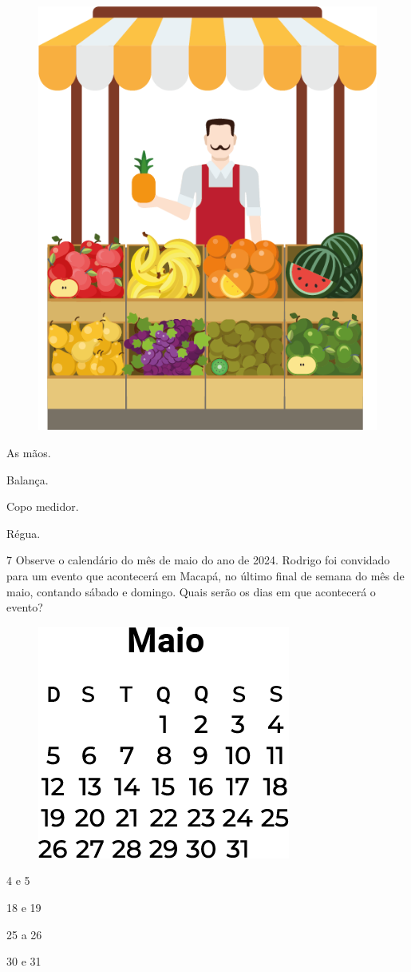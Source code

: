 \begin{figure}[htpb!]
\centering
\includegraphics[width=.3\textwidth]{./media/image154.png}
\end{figure}

\begin{escolha}
\item As mãos.

\item Balança.

\item Copo medidor.

\item Régua.
\end{escolha}

\pagebreak
\num{7} Observe o calendário do mês de maio do ano de 2024. Rodrigo foi
convidado para um evento que acontecerá em Macapá, no último final de
semana do mês de maio, contando sábado e domingo. Quais serão os dias em que acontecerá o evento?

\begin{figure}[htpb!]
\centering
\includegraphics[width=.35\textwidth]{./media/image155.png}
\end{figure}

\begin{escolha}
\item 4 e 5

\item 18 e 19

\item 25 a 26

\item 30 e 31
\end{escolha}

